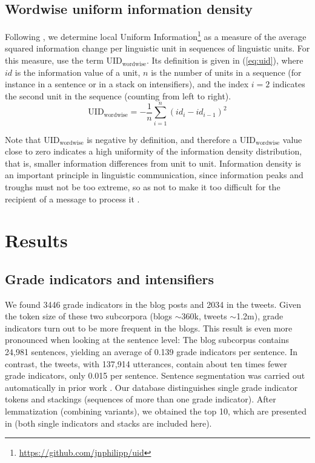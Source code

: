 \documentclass[output=paper,colorlinks,citecolor=brown]{langscibook}
\begin{document}
\subsection{Wordwise uniform information density}

Following \citet{collins2014information}, we  determine local Uniform Information\footnote{\url{https://github.com/jnphilipp/uid}} as a measure of the average squared information change per linguistic unit in sequences of linguistic units.  For this measure, \citet{scherihou2022} use the term $\mathrm{UID_{wordwise}}$. Its definition is given in (\ref{eq:uid}), where $id$ is the information value of a unit, $n$ is the number of units in a sequence (for instance in a sentence or in a stack on intensifiers), and the index $i=2$ indicates the second unit in the sequence (counting from left to right).
\begin{equation}\label{eq:uid}
\mathrm{UID_{wordwise}} = -\frac{1}{n} \sum_{i=1}^{n}(id_i - id_{i-1})^2
\end{equation}

Note that $\mathrm{UID_{wordwise}}$ is negative by definition, and therefore a $\mathrm{UID_{wordwise}}$ value close to zero indicates a high uniformity of the information density distribution, that is, smaller information differences from unit to unit. 
 Information density is an important principle in linguistic communication, since information peaks and troughs must not be too extreme, so as not to make it too difficult for the recipient of a message to process it \citep{fenk1980konstanz, aylett2004smooth, levy2007speakers, jaeger2010redundancy}. 

\section{Results}\label{sec:5_results}\largerpage

\subsection{Grade indicators and intensifiers}

We found 3446 grade indicators in the blog posts and 2034 in the tweets. Given the token size of these two subcorpora (blogs $\sim$360k, tweets $\sim$1.2m), grade indicators turn out to be more frequent in the blogs. This result is even more pronounced when looking at the sentence level: The blog subcorpus contains 24,981 sentences, yielding an average of 0.139 grade indicators per sentence. In contrast, the tweets, with 137,914 utterances, contain about ten times fewer grade indicators, only 0.015 per sentence. Sentence segmentation was carried out automatically in prior work \citep{schefflerEtal2023corpus}. 
Our database distinguishes single grade indicator tokens and stackings (sequences of more than one grade indicator). After lemmatization (combining variants), we obtained the top 10, which are presented in  (both single indicators and stacks are included here).
\end{document}

